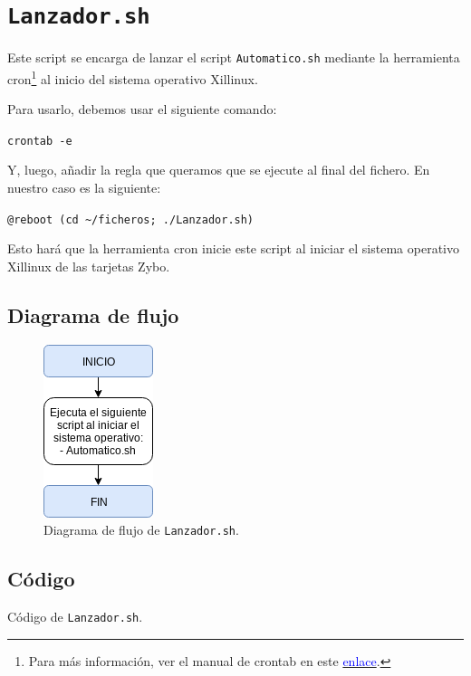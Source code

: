 \section{\texttt{Lanzador.sh}}
Este script se encarga de lanzar el script \texttt{Automatico.sh} mediante la herramienta cron\footnote{Para más información, ver el manual de crontab en este \href{https://linux.die.net/man/5/crontab}{\textcolor{blue}{enlace}}.} al inicio del sistema operativo Xillinux.

Para usarlo, debemos usar el siguiente comando:
\begin{center}
	\texttt{crontab -e}
\end{center}

Y, luego, añadir la regla que queramos que se ejecute al final del fichero. En nuestro caso es la siguiente:
\begin{center}
	\texttt{@reboot (cd \textasciitilde/ficheros; ./Lanzador.sh)}
\end{center}

Esto hará que la herramienta cron inicie este script al iniciar el sistema operativo Xillinux de las tarjetas Zybo.

\newpage
\subsection{Diagrama de flujo}
\begin{figure}[h]
	\centering
	\includegraphics[scale=0.9]{Anexos/Anexo3/Diagramas/Lanzador.png}
	\caption{Diagrama de flujo de \texttt{Lanzador.sh}.}
	\label{Diagrama de flujo de Lanzador.sh}
\end{figure}

\subsection{Código}

\begin{center}
	Código de \texttt{Lanzador.sh}.
\end{center}


